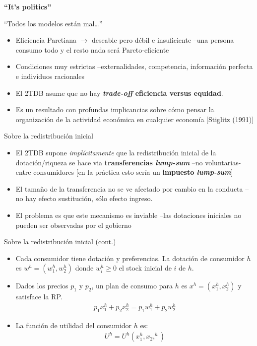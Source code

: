 \documentclass[
  ignorenonframetext,
]{beamer}
\providecommand{\tightlist}{%
  \setlength{\itemsep}{0pt}\setlength{\parskip}{0pt}}\usepackage{longtable,booktabs,array}
\begin{document}
\begin{frame}{\textbf{``It's politics''}}
\begin{block}{``Todos los modelos están mal\ldots{}''}
\protect\hypertarget{todos-los-modelos-estuxe1n-mal}{}
\begin{itemize}
\tightlist
\item
  Eficiencia Paretiana \(\longrightarrow\) deseable pero débil e
  insuficiente --una persona consumo todo y el resto nada será
  Pareto-eficiente
\item
  Condiciones muy estrictas --externalidades, competencia, información
  perfecta e individuos racionales
\item
  El 2TDB asume que no hay \textbf{\emph{trade-off} eficiencia versus
  equidad}.
\item
  Es un resultado con profundas implicancias sobre cómo pensar la
  organización de la actividad económica en cualquier economía
  {[}Stiglitz (1991){]}
\end{itemize}
\end{block}

\begin{block}{Sobre la redistribución inicial}
\protect\hypertarget{sobre-la-redistribuciuxf3n-inicial}{}
\begin{itemize}
\tightlist
\item
  El 2TDB supone \emph{implícitamente} que la redistribución inicial de
  la dotación/riqueza se hace via \textbf{transferencias
  \emph{lump-sum}} --no voluntarias- entre consumidores {[}en la
  práctica esto sería un \textbf{impuesto \emph{lump-sum}}{]}
\item
  El tamaño de la transferencia no se ve afectado por cambio en la
  conducta --no hay efecto sustitución, sólo efecto ingreso.
\item
  El problema es que este mecanismo es inviable --las dotaciones
  iniciales no pueden ser observadas por el gobierno
\end{itemize}
\end{block}

\begin{block}{Sobre la redistribución inicial (cont.)}
\protect\hypertarget{sobre-la-redistribuciuxf3n-inicial-cont.}{}
\begin{itemize}
\tightlist
\item
  Cada consumidor tiene dotación y preferencias. La dotación de
  consumidor \(h\) es \(w^{h}=(w_{1}^{h},w_{2}^{h})\) donde
  \(w_{i}^{h} \geq 0\) el stock inicial de \(i\) de \(h\).
\item
  Dados los precios \(p_{1}\) y \(p_{2}\), un plan de consumo para \(h\)
  es \(x^{h}=(x_{1}^{h},x_{2}^{h})\) y satisface la RP.
  \[\begin{aligned}
  p_{1}x_{1}^{h}+p_{2}x_{2}^{h}=p_{1}w_{1}^{h}+p_{2}w_{2}^{h}
  \end{aligned}\]
\item
  La función de utilidad del consumidor \(h\) es: \[\begin{aligned}
  U^{h}=U^{h}(x_{1}^{h},x_{2},^{h})
  \end{aligned}\]
\end{itemize}
\end{block}


\end{frame}
\end{document}
